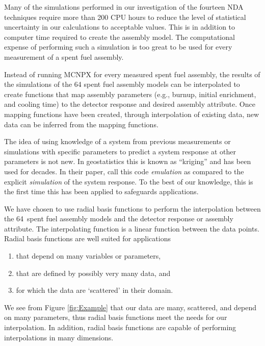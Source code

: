 \documentclass{ansnse}
\begin{document}
Many of the simulations performed in our investigation of the fourteen NDA techniques require more than 200 CPU hours to reduce the level of statistical uncertainty in our calculations to acceptable values.  This is in addition to computer time required to create the assembly model.  The computational expense of performing such a simulation is too great to be used for every measurement of a spent fuel assembly.  

Instead of running MCNPX for every measured spent fuel assembly, the results of the simulations of the 64 spent fuel assembly models can be interpolated to create functions that map assembly parameters (e.g., burnup, initial enrichment, and cooling time) to the detector response and desired assembly attribute.  Once mapping functions have been created, through interpolation of existing data, new data can be inferred from the mapping functions.  

The idea of using knowledge of a system from previous measurements or simulations with specific parameters to predict a system response at other parameters is not new.  In geostatistics this is known as ``kriging''\cite{Krige:1951A-Sta-0,Matheron:1973The-i-0} and has been used for decades.   In their paper, \citet{Heitmann:2006Cosmi-0} call this code \emph{emulation} as compared to the explicit \emph{simulation} of the system response.  To the best of our knowledge, this is the first time this has been applied to safeguards applications. 

We have chosen to use radial basis functions to perform the interpolation between the 64~spent fuel assembly models and the detector response or assembly attribute.  The interpolating function is a linear function between the data points.  Radial basis functions are well suited for applications\cite{Buhmann:2003Radia-0}
\begin{enumerate}
    \item that depend on many variables or parameters,
    \item that are defined by possibly very many data, and
    \item for which the data are `scattered' in their domain.
\end{enumerate}
We see from Figure \ref{fig:Example} that our data are many, scattered, and depend on many parameters, thus radial basis functions meet the needs for our interpolation.  In addition, radial basis functions are capable of performing interpolations in many dimensions.
\end{document}
